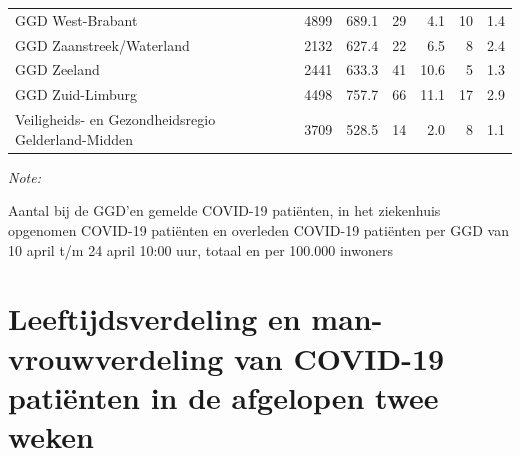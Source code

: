 \documentclass[
  english,
  man,floatsintext]{apa6}
\begin{document}
\begin{table}
\begin{threeparttable}
\begin{tabular}{lrrrrrr}
GGD West-Brabant & 4899 & 689.1 & 29 & 4.1 & 10 & 1.4\\
GGD Zaanstreek/Waterland & 2132 & 627.4 & 22 & 6.5 & 8 & 2.4\\
GGD Zeeland & 2441 & 633.3 & 41 & 10.6 & 5 & 1.3\\
GGD Zuid-Limburg & 4498 & 757.7 & 66 & 11.1 & 17 & 2.9\\
Veiligheids- en Gezondheidsregio Gelderland-Midden & 3709 & 528.5 & 14 & 2.0 & 8 & 1.1\\
\bottomrule
\end{tabular}
\begin{tablenotes}
\item \textit{Note: } 
\item Aantal bij de GGD’en gemelde COVID-19 patiënten, in het ziekenhuis opgenomen COVID-19 patiënten en overleden COVID-19 patiënten per GGD van 10 april t/m 24 april 10:00 uur, totaal en per 100.000 inwoners
\end{tablenotes}
\end{threeparttable}
\endgroup{}
\end{table}

\newpage

\hypertarget{leeftijdsverdeling-en-man-vrouwverdeling-van-covid-19-patiuxebnten-in-de-afgelopen-twee-weken}{%
\section{Leeftijdsverdeling en man-vrouwverdeling van COVID-19 patiënten in de afgelopen twee weken}\label{leeftijdsverdeling-en-man-vrouwverdeling-van-covid-19-patiuxebnten-in-de-afgelopen-twee-weken}}
\end{document}
